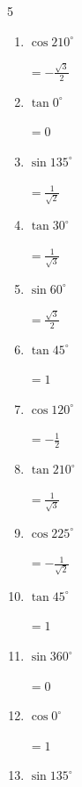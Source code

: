 \begin{multicols}{5}
\begin{enumerate}
        $\displaystyle =-\frac{1}{2}$

  \item $\displaystyle \cos{210^\circ}$

        $\displaystyle =-\frac{\sqrt{3}}{2}$

  \item $\displaystyle \tan{0^\circ}$

        $\displaystyle =0$

  \item $\displaystyle \sin{135^\circ}$

        $\displaystyle =\frac{1}{\sqrt{2}}$

  \item $\displaystyle \tan{30^\circ}$

        $\displaystyle =\frac{1}{\sqrt{3}}$

  \item $\displaystyle \sin{60^\circ}$

        $\displaystyle =\frac{\sqrt{3}}{2}$

  \item $\displaystyle \tan{45^\circ}$

        $\displaystyle =1$

  \item $\displaystyle \cos{120^\circ}$

        $\displaystyle =-\frac{1}{2}$

  \item $\displaystyle \tan{210^\circ}$

        $\displaystyle =\frac{1}{\sqrt{3}}$

  \item $\displaystyle \cos{225^\circ}$

        $\displaystyle =-\frac{1}{\sqrt{2}}$

  \item $\displaystyle \tan{45^\circ}$

        $\displaystyle =1$

\columnbreak %

  \item $\displaystyle \sin{360^\circ}$

        $\displaystyle =0$

  \item $\displaystyle \cos{0^\circ}$

        $\displaystyle =1$

  \item $\displaystyle \sin{135^\circ}$


\end{enumerate}
\end{multicols}
